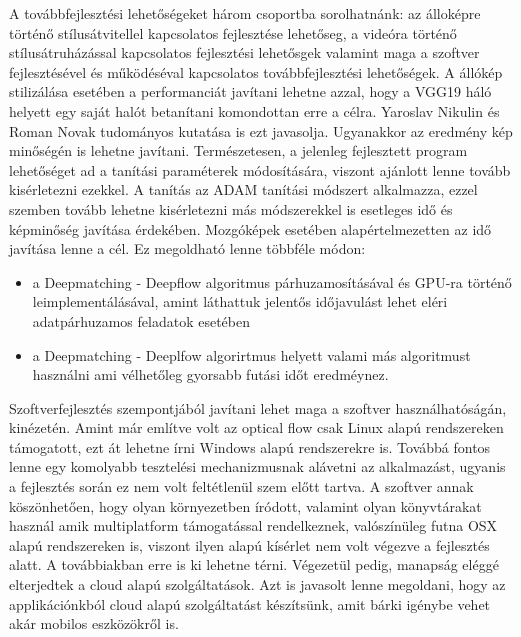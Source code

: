 \documentclass[12pt, a4paper, oneside]{book}
\theoremstyle{tetel}
\begin{document}
A továbbfejlesztési lehetőségeket három csoportba sorolhatnánk: az álloképre történő stílusátvitellel kapcsolatos fejlesztése lehetőseg, a videóra történő stílusátruházással kapcsolatos fejlesztési lehetősgek valamint maga a szoftver fejlesztésével és működéséval kapcsolatos továbbfejlesztési lehetőségek.
\newline
\indent
A állókép stilizálása esetében a performanciát javítani lehetne azzal, hogy a VGG19 háló helyett egy saját halót betanítani komondottan erre a célra. Yaroslav Nikulin és Roman Novak tudományos kutatása\cite{16} is ezt javasolja. Ugyanakkor az eredmény kép minőségén is lehetne javítani. Természetesen, a jelenleg fejlesztett program lehetőséget ad a tanítási paraméterek módosítására, viszont ajánlott lenne tovább kisérletezni ezekkel. A tanítás az ADAM tanítási módszert alkalmazza, ezzel szemben tovább lehetne kisérletezni más módszerekkel is esetleges idő és képminőség javítása érdekében.
\newline
\indent
Mozgóképek esetében alapértelmezetten az idő javítása lenne a cél. Ez megoldható lenne többféle módon:
\begin{itemize}
	\item a Deepmatching - Deepflow algoritmus párhuzamosításával és GPU-ra történő leimplementálásával, amint láthattuk jelentős időjavulást lehet eléri adatpárhuzamos feladatok esetében
	\item a Deepmatching - Deeplfow algorirtmus helyett valami más algoritmust használni ami vélhetőleg gyorsabb futási időt eredméynez.
\end{itemize}

Szoftverfejlesztés szempontjából javítani lehet maga a szoftver használhatóságán, kinézetén. Amint már említve volt az optical flow csak Linux alapú rendszereken támogatott, ezt át lehetne írni Windows alapú rendszerekre is. Továbbá fontos lenne egy komolyabb tesztelési mechanizmusnak alávetni az alkalmazást, ugyanis a fejlesztés során ez nem volt feltétlenül szem előtt tartva.
\newline
\indent
A szoftver annak köszönhetően, hogy olyan környezetben íródott, valamint olyan könyvtárakat használ amik multiplatform támogatással rendelkeznek, valószínüleg futna OSX alapú rendszereken is, viszont ilyen alapú kísérlet nem volt végezve a fejlesztés alatt. A továbbiakban erre is ki lehetne térni. 
\newline
\indent
Végezetül pedig, manapság eléggé elterjedtek a cloud alapú szolgáltatások. Azt is javasolt lenne megoldani, hogy az applikációnkból cloud alapú szolgáltatást készítsünk, amit bárki igénybe vehet akár mobilos eszközökről is.
\end{document}
